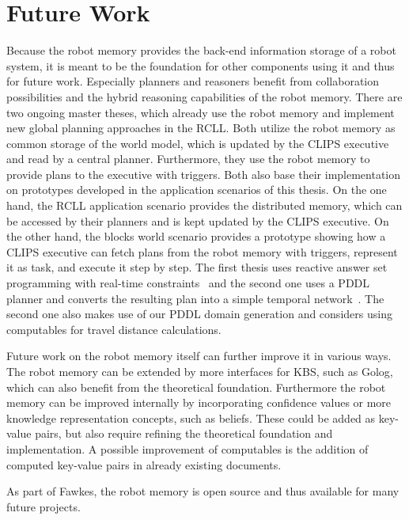 \section{Future Work}
\label{sec:future-work}
Because the robot memory provides the back-end information storage of
a robot system, it is meant to be the foundation for other components
using it and thus for future work. Especially planners and reasoners
benefit from collaboration possibilities and the hybrid reasoning
capabilities of the robot memory. There are two ongoing master theses,
which already use the robot memory and implement new global planning
approaches in the RCLL. Both utilize the robot memory as common
storage of the world model, which is updated by the CLIPS executive
and read by a central planner. Furthermore, they use the robot memory
to provide plans to the executive with triggers. Both also base their
implementation on prototypes developed in the application scenarios of
this thesis. On the one hand, the RCLL application scenario provides
the distributed memory, which can be accessed by their planners and is
kept updated by the CLIPS executive. On the other hand, the blocks
world scenario provides a prototype showing how a CLIPS executive can
fetch plans from the robot memory with triggers, represent it as task,
and execute it step by step. The first thesis uses reactive answer set
programming with real-time constraints~\cite{bjoern-thesis} and the
second one uses a PDDL planner and converts the resulting plan into a
simple temporal network~\cite{matthias-thesis}. The second one also
makes use of our PDDL domain generation and considers using
computables for travel distance calculations.

Future work on the robot memory itself can further improve it in
various ways. The robot memory can be extended by more interfaces for
KBS, such as Golog, which can also benefit from the theoretical
foundation. Furthermore the robot memory can be improved internally by
incorporating confidence values or more knowledge representation
concepts, such as beliefs. These could be added as key-value pairs,
but also require refining the theoretical foundation and
implementation. A possible improvement of computables is the addition
of computed key-value pairs in already existing documents.

As part of Fawkes, the robot memory is open source and thus available
for many future projects.

